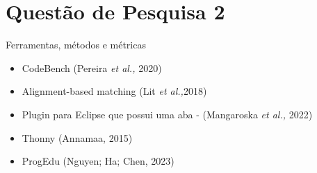 \documentclass{if-beamer}
\begin{document}
\section{Questão de Pesquisa 2}
\begin{frame}{Ferramentas, métodos e métricas}
\begin{itemize}
\item CodeBench (Pereira \textit{et al.,} 2020)
\item Alignment-based matching (Lit \textit{et al.,}2018)
\item Plugin para Eclipse que possui uma aba - (Mangaroska \textit{et al.,} 2022)
\item Thonny (Annamaa, 2015)
\item ProgEdu (Nguyen; Ha; Chen, 2023)
\end{itemize}
\end{frame}
\end{document}
